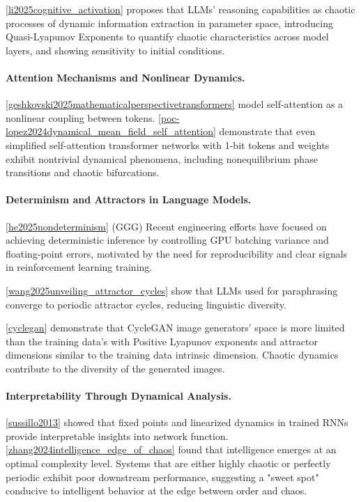 \documentclass[a4paper,12pt]{article}
\begin{document}
\ref{li2025cognitive_activation} proposes that LLMs' reasoning capabilities as chaotic processes of dynamic information extraction in parameter space, introducing Quasi-Lyapunov Exponents to quantify chaotic characteristics across model layers, and showing sensitivity to initial conditions.

\paragraph{Attention Mechanisms and Nonlinear Dynamics.}
\ref{geshkovski2025mathematicalperspectivetransformers} model self-attention as a nonlinear coupling between tokens.
\ref{poc-lopez2024dynamical_mean_field_self_attention} demonstrate that even simplified self-attention transformer networks with 1-bit tokens and weights exhibit nontrivial dynamical phenomena, including nonequilibrium phase transitions and chaotic bifurcations. 

\paragraph{Determinism and Attractors in Language Models.}
\ref{he2025nondeterminism} (GGG)
Recent engineering efforts have focused on achieving deterministic inference by controlling GPU batching variance and floating-point errors, motivated by the need for reproducibility and clear signals in reinforcement learning training. 

\ref{wang2025unveiling_attractor_cycles} show that LLMs used for paraphrasing converge to periodic attractor cycles, reducing linguistic diversity.

\ref{cyclegan} %
demonstrate that CycleGAN image generators' space is more limited than the training data's with Positive Lyapunov exponents and attractor dimensions similar to the training data intrinsic dimension. Chaotic dynamics contribute to the diversity of the generated images.

\paragraph{Interpretability Through Dynamical Analysis.}
\ref{sussillo2013} showed that fixed points and linearized dynamics in trained RNNs provide interpretable insights into network function. \ref{zhang2024intelligence_edge_of_chaos} found that intelligence emerges at an optimal complexity level. Systems that are either highly chaotic or perfectly periodic exhibit poor downstream performance, suggesting a "sweet spot" conducive to intelligent behavior at the edge between order and chaos.
\end{document}
